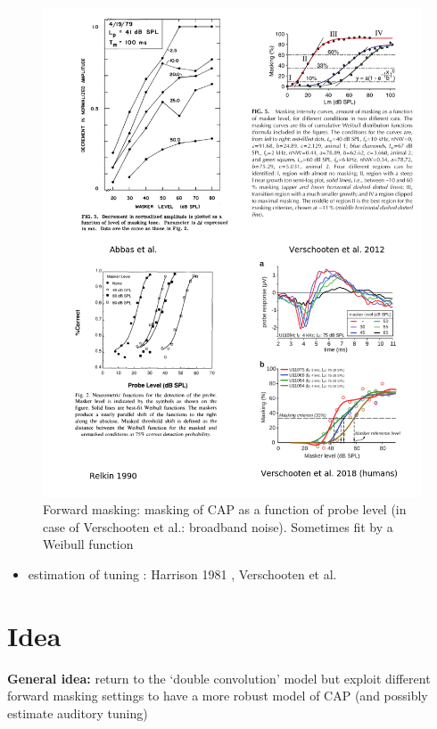 \documentclass[]{article}
\providecommand{\tightlist}{%
  \setlength{\itemsep}{0pt}\setlength{\parskip}{0pt}}
\begin{document}
\begin{figure}
\centering
\includegraphics{./figures/forward_masking.png}
\caption{Forward masking: masking of CAP as a function of probe level
(in case of Verschooten et al.: broadband noise). Sometimes fit by a
Weibull function \label{fig:masking}}
\end{figure}

\begin{itemize}
\tightlist
\item
  estimation of tuning : Harrison 1981
  \citep{Harrison1981, Harrison1981a}, Verschooten et al.
\end{itemize}

\clearpage

\section{Idea}\label{idea}

\textbf{General idea: } return to the `double convolution' model but
exploit different forward masking settings to have a more robust model
of CAP (and possibly estimate auditory tuning)
\end{document}
